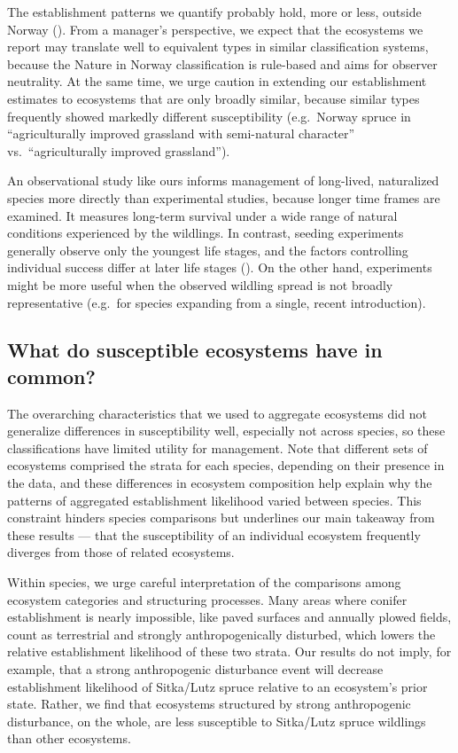 \documentclass[
]{article}
\begin{document}
The establishment patterns we quantify probably hold, more or less, outside
Norway (). From a manager's perspective, we
expect that the ecosystems we report may translate well to equivalent types in
similar classification systems, because the Nature in Norway classification is
rule-based and aims for observer neutrality. At the same time, we urge caution
in extending our establishment estimates to ecosystems that are only broadly
similar, because similar types frequently showed markedly different
susceptibility (e.g.~Norway spruce in ``agriculturally improved grassland with
semi-natural character'' vs.~``agriculturally improved grassland'').

An observational study like ours informs management of long-lived, naturalized
species more directly than experimental studies, because longer time frames are
examined. It measures long-term survival under a wide range of natural
conditions experienced by the wildlings. In contrast, seeding experiments
generally observe only the youngest life stages, and the factors controlling
individual success differ at later life stages
(). On the other hand, experiments might be
more useful when the observed wildling spread is not broadly representative
(e.g.~for species expanding from a single, recent introduction).

\subsection{What do susceptible ecosystems have in common?}\label{what-do-susceptible-ecosystems-have-in-common}

The overarching characteristics that we used to aggregate ecosystems did not
generalize differences in susceptibility well, especially not across species, so
these classifications have limited utility for management. Note that different
sets of ecosystems comprised the strata for each species, depending on their
presence in the data, and these differences in ecosystem composition help
explain why the patterns of aggregated establishment likelihood varied between
species. This constraint hinders species comparisons but underlines our main
takeaway from these results --- that the susceptibility of an individual
ecosystem frequently diverges from those of related ecosystems.

Within species, we urge careful interpretation of the comparisons among
ecosystem categories and structuring processes. Many areas where conifer
establishment is nearly impossible, like paved surfaces and annually plowed
fields, count as terrestrial and strongly anthropogenically disturbed, which
lowers the relative establishment likelihood of these two strata. Our results do
not imply, for example, that a strong anthropogenic disturbance event will
decrease establishment likelihood of Sitka/Lutz spruce relative to an
ecosystem's prior state. Rather, we find that ecosystems structured by strong
anthropogenic disturbance, on the whole, are less susceptible to Sitka/Lutz
spruce wildlings than other ecosystems.
\end{document}
